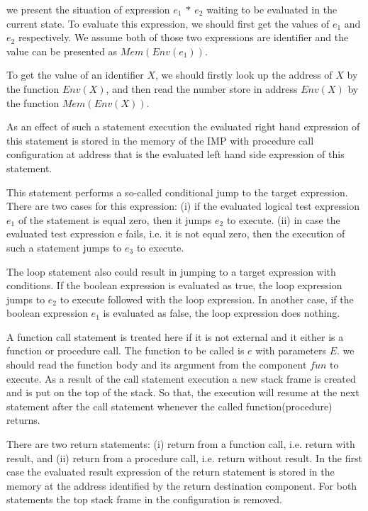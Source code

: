\documentclass[letterpaper, 10 pt, conference]{IEEEtran}
\begin{document}
we present the situation of expression $e_1~*~e_2$ waiting to be evaluated in the current state. To evaluate this expression, we should first get the values of $e_1$ and $e_2$ respectively. We assume both of those two expressions are identifier and the value can be presented as $Mem(Env(e_1))$.
\par To get the value of an identifier $X$, we should firstly look up the address of $X$ by the function $Env(X)$, and then read the number store in address $Env(X)$ by the function $Mem(Env(X))$.
\par As an effect of such a statement execution the evaluated right hand
expression of this statement is stored in the memory of the IMP with procedure call configuration at
address that is the evaluated left hand side expression of this statement.
\par This statement performs a so-called conditional jump to the target expression. There are two cases for this expression: (i) if the evaluated logical test expression $e_1$
of the statement is equal zero, then it jumps $e_2$ to execute. (ii) in case the evaluated test expression e fails, i.e. it is not equal zero, then the
execution of such a statement jumps to $e_3$ to execute.
\par The loop statement also could result in jumping to a target expression with conditions. If the boolean expression is evaluated as true, the loop expression jumps to $e_2$ to execute followed with the loop expression. In another case, if the boolean expression $e_1$ is evaluated as false, the loop expression does nothing.
\par A function call statement is treated here if it is not external and it either is a function or
procedure call. The function to be called is $e$ with parameters $E$. we should read the function body and its argument from the component $fun$ to execute. As a result of the
call statement execution a new stack frame is created and is put on the top of the stack. So
that, the execution will resume at the next statement after the call statement whenever
the called function(procedure) returns.
\par There are two return statements: (i) return from a function call, i.e. return
with result, and (ii) return from a procedure call, i.e. return without result. In the first
case the evaluated result expression of the return statement is stored in the memory
at the address identified by the return destination component. For both statements the top stack frame in the configuration is removed.
\end{document}
